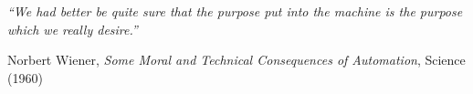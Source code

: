 \cleardoublepage
\thispagestyle{empty}
\vspace*{\fill}
\begin{flushright}
\begin{minipage}{0.75\textwidth}
\begin{flushright}
\itshape
``We had better be quite sure that the purpose put into the machine is the
purpose which we really desire.''
\par\vspace{1em}
\upshape
\normalfont Norbert Wiener, \emph{Some Moral and Technical Consequences of Automation}, Science (1960)
\end{flushright}
\end{minipage}
\end{flushright}
\vspace*{\fill}
\cleardoublepage
